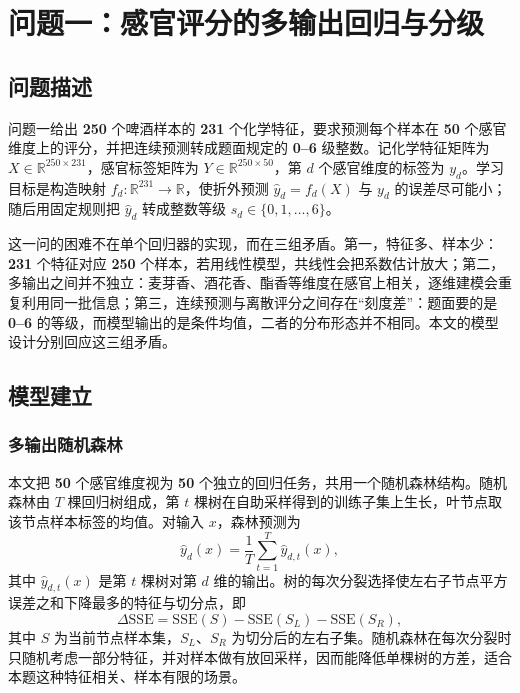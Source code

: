 \section{问题一：感官评分的多输出回归与分级}

\subsection{问题描述}

问题一给出 \textbf{250} 个啤酒样本的 \textbf{231} 个化学特征，要求预测每个样本在 \textbf{50} 个感官维度上的评分，并把连续预测转成题面规定的 \textbf{0--6} 级整数。记化学特征矩阵为 $X\in\mathbb{R}^{250\times 231}$，感官标签矩阵为 $Y\in\mathbb{R}^{250\times 50}$，第 $d$ 个感官维度的标签为 $y_d$。学习目标是构造映射 $f_d\colon\mathbb{R}^{231}\to\mathbb{R}$，使折外预测 $\hat y_d=f_d(X)$ 与 $y_d$ 的误差尽可能小；随后用固定规则把 $\hat y_d$ 转成整数等级 $s_d\in\{0,1,\ldots,6\}$。

这一问的困难不在单个回归器的实现，而在三组矛盾。第一，特征多、样本少：\textbf{231} 个特征对应 \textbf{250} 个样本，若用线性模型，共线性会把系数估计放大；第二，多输出之间并不独立：麦芽香、酒花香、酯香等维度在感官上相关，逐维建模会重复利用同一批信息；第三，连续预测与离散评分之间存在“刻度差”：题面要的是 \textbf{0--6} 的等级，而模型输出的是条件均值，二者的分布形态并不相同。本文的模型设计分别回应这三组矛盾。

\subsection{模型建立}

\subsubsection{多输出随机森林}

本文把 \textbf{50} 个感官维度视为 \textbf{50} 个独立的回归任务，共用一个随机森林结构。随机森林由 $T$ 棵回归树组成，第 $t$ 棵树在自助采样得到的训练子集上生长，叶节点取该节点样本标签的均值。对输入 $x$，森林预测为
\begin{equation}
\hat y_d(x)=\frac{1}{T}\sum_{t=1}^{T}\hat y_{d,t}(x),
\label{eq:rf}
\end{equation}
其中 $\hat y_{d,t}(x)$ 是第 $t$ 棵树对第 $d$ 维的输出。树的每次分裂选择使左右子节点平方误差之和下降最多的特征与切分点，即
\begin{equation}
\Delta \mathrm{SSE}= \mathrm{SSE}(S)-\mathrm{SSE}(S_L)-\mathrm{SSE}(S_R),
\label{eq:split}
\end{equation}
其中 $S$ 为当前节点样本集，$S_L$、$S_R$ 为切分后的左右子集。随机森林在每次分裂时只随机考虑一部分特征，并对样本做有放回采样，因而能降低单棵树的方差，适合本题这种特征相关、样本有限的场景\cite{zhou2016,breiman2001}。

